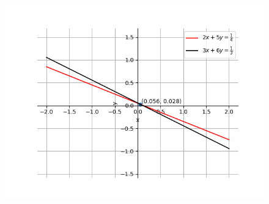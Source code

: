 \documentclass[journal]{IEEEtran}
\begin{document}
\begin{figure}[h]
    \centering
    \includegraphics[width=1\columnwidth]{Figs/plot(py).png}
\end{figure}
\end{document}
